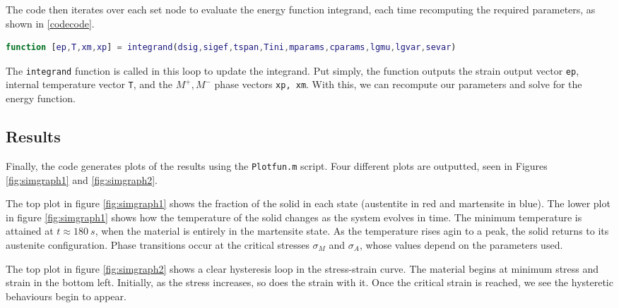 \begin{multicols}{2}
The code then iterates over each set node to evaluate the energy function integrand, each time recomputing the required parameters, as shown in \ref{codecode}.
\begin{lstlisting}[language=matlab, caption=Integrand function parameters]
function [ep,T,xm,xp] = integrand(dsig,sigef,tspan,Tini,mparams,cparams,lgmu,lgvar,sevar)
\end{lstlisting}
The \texttt{integrand} function is called in this loop to update the integrand. Put simply, the function outputs the strain output vector \texttt{ep}, internal temperature vector \texttt{T}, and the $M^+,M^-$ phase vectors \texttt{xp, xm}. With this, we can recompute our parameters and solve for the energy function.

\subsection{Results}
Finally, the code generates plots of the results using the \texttt{Plotfun.m} script. Four different plots are outputted, seen in Figures \ref{fig:simgraph1} and \ref{fig:simgraph2}. 

The top plot in figure \ref{fig:simgraph1} shows the fraction of the solid in each state (austentite in red and martensite in blue). The lower plot in figure \ref{fig:simgraph1} shows how the temperature of the solid changes as the system evolves in time. The minimum temperature is attained at $t\approx\SI{180}{s}$, when the material is entirely in the martensite state. As the temperature rises agin to a peak, the solid returns to its austenite configuration. Phase transitions occur at the critical stresses $\sigma_M$ and $\sigma_A$, whose values depend on the parameters used. 

The top plot in figure \ref{fig:simgraph2} shows a clear hysteresis loop in the stress-strain curve. The material begins at minimum stress and strain in the bottom left. Initially, as the stress increases, so does the strain with it. Once the critical strain is reached, we see the hysteretic behaviours begin to appear. 

\end{multicols}
\vspace{30pt}
